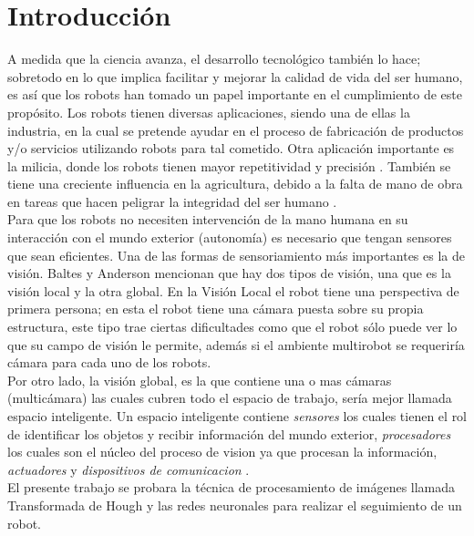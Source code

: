 \documentclass[conference]{IEEEtran}
\begin{document}
\section{Introducci\'on}
A medida que la ciencia avanza, el desarrollo tecnol\'ogico tambi\'en lo hace; sobretodo en lo que implica facilitar y mejorar la calidad de vida del ser humano, es as\'i que los robots han tomado un papel importante en el cumplimiento de este prop\'osito. Los robots tienen diversas aplicaciones, siendo una de ellas la industria, en la cual se pretende ayudar en el proceso de fabricaci\'on de productos y/o servicios utilizando robots para tal cometido\cite{Morales_g}. Otra aplicaci\'on importante es la milicia, donde los robots tienen mayor repetitividad y precisi\'on \cite{Garcia_g}. Tambi\'en se tiene una creciente influencia en la agricultura, debido a la falta de mano de obra en tareas que hacen peligrar la integridad del ser humano \cite{Vasquez_g}.\\
Para que los robots no necesiten intervenci\'on de la  mano humana  en  su  interacci\'on    con el mundo exterior (autonom\'ia) es necesario que tengan sensores que sean eficientes. Una de las formas de sensoriamiento m\'as importantes es la de visi\'on. Baltes y Anderson mencionan que hay dos tipos de visi\'on, una que es la visi\'on local y la otra global. En la Visi\'on Local el robot tiene  una perspectiva de primera persona; en esta el robot tiene una c\'amara puesta sobre su propia estructura, este tipo trae ciertas dificultades como que el robot s\'olo puede ver lo que su campo de visi\'on le permite, adem\'as si el ambiente multirobot se requerir\'ia c\'amara para cada uno de los robots.  \cite {Baltes_g} \\
Por otro lado, la visi\'on global, es la que contiene una o mas c\'amaras (multic\'amara) las cuales cubren todo el espacio de trabajo, ser\'ia mejor llamada  espacio inteligente. Un espacio inteligente contiene \textit{sensores} los cuales tienen el rol de identificar los objetos y recibir informaci\'on del mundo exterior, \textit{procesadores} los cuales  son el n\'ucleo del proceso de vision ya que procesan la informaci\'on, \textit{actuadores}  y \textit{dispositivos de comunicacion} \cite{Brezac_g}.\\

El presente trabajo se probara la t\'ecnica de procesamiento de im\'agenes llamada Transformada de Hough y las redes neuronales  para realizar el seguimiento de un robot. \\
\end{document}
